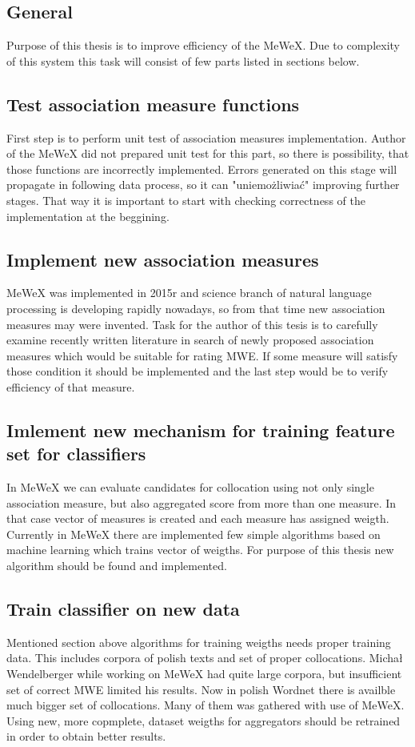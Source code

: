 \subsection{General}
Purpose of this thesis is to improve efficiency of the MeWeX. Due to complexity of this system this task 
will consist of few parts listed in sections below.

\subsection{Test association measure functions}
First step is to perform unit test of association measures implementation. Author of the MeWeX did not prepared unit test for this part, 
so there is possibility, that those functions are incorrectly implemented. Errors generated on this stage will propagate in following data process, 
so it can "uniemożliwiać" improving further stages. That way it is important to start with checking correctness of the implementation 
at the beggining.

\subsection{Implement new association measures}
MeWeX was implemented in 2015r and science branch of natural language processing is developing rapidly nowadays, 
so from that time new association measures may were invented. Task for the author of this tesis is to carefully examine recently written literature 
in search of newly proposed association measures which would be suitable for rating MWE. If some measure will satisfy those condition it should 
be implemented and the last step would be to verify efficiency of that measure.

\subsection{Imlement new mechanism for training feature set for classifiers}
In MeWeX we can evaluate candidates for collocation using not only single association measure, but also aggregated score from more than one measure. 
In that case vector of measures is created and each measure has assigned weigth. Currently in MeWeX there are implemented few simple algorithms 
based on machine learning which trains vector of weigths. For purpose of this thesis new algorithm should be found and implemented.

\subsection{Train classifier on new data}
Mentioned section above algorithms for training weigths needs proper training data. This includes corpora of polish texts and set 
of proper collocations. Michał Wendelberger while working on MeWeX had quite large corpora, but insufficient set of correct MWE limited his results. 
Now in polish Wordnet there is availble much bigger set of collocations. Many of them was gathered with use of MeWeX.
Using new, more copmplete, dataset weigths for aggregators should be retrained in order to obtain better results.

